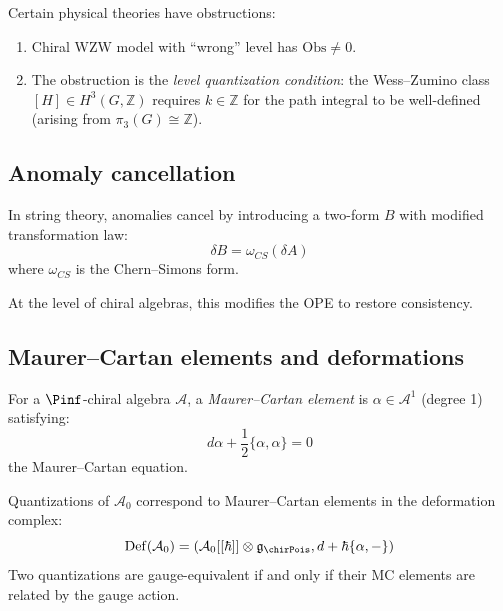 \begin{example}\label{ex:anomaly}
Certain physical theories have obstructions:
\begin{enumerate}[label=(\roman*)]
\item Chiral WZW model with ``wrong'' level has $\mathrm{Obs} \neq 0$.
\item The obstruction is the \emph{level quantization condition}: the
      Wess--Zumino class $[H] \in H^3(G, \mathbb{Z})$ requires $k \in \mathbb{Z}$
      for the path integral to be well-defined (arising from $\pi_3(G) \cong \mathbb{Z}$).
\end{enumerate}
\end{example}


\subsection{Anomaly cancellation}

\begin{theorem}\label{thm:green-schwarz}
In string theory, anomalies cancel by introducing a two-form $B$ with modified 
transformation law:
\[
\delta B = \omega_{CS}(\delta A)
\]
where $\omega_{CS}$ is the Chern--Simons form.

At the level of chiral algebras, this modifies the OPE to restore consistency.
\end{theorem}


\subsection{Maurer--Cartan elements and deformations}

\begin{definition}\label{def:mc-element}
For a $\Pinf$-chiral algebra $\mathcal{A}$, a \emph{Maurer--Cartan element} is 
$\alpha \in \mathcal{A}^1$ (degree 1) satisfying:
\[
d\alpha + \frac{1}{2}\{\alpha, \alpha\} = 0
\]
the Maurer--Cartan equation.
\end{definition}

\begin{theorem}\label{thm:mc-quantization}
Quantizations of $\mathcal{A}_0$ correspond to Maurer--Cartan elements in the 
deformation complex:
\[
\mathrm{Def}(\mathcal{A}_0) = (\mathcal{A}_0[[\hbar]] \otimes \mathfrak{g}_{\chirPois}, d + \hbar\{\alpha, -\})
\]
Two quantizations are gauge-equivalent if and only if their MC elements are related by the
gauge action.
\end{theorem}

